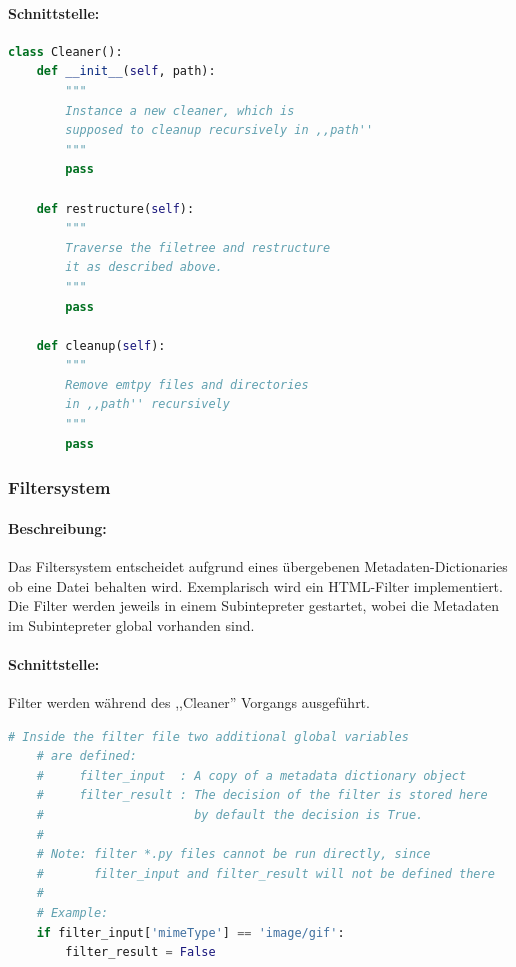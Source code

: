 \paragraph{Schnittstelle:} 
\label{par:schnittstelle_}
\begin{lstlisting}[language=python]
class Cleaner():
    def __init__(self, path):
        """
        Instance a new cleaner, which is
        supposed to cleanup recursively in ,,path''
        """
        pass

    def restructure(self): 
        """
        Traverse the filetree and restructure
        it as described above.
        """
        pass
  
    def cleanup(self):
        """
        Remove emtpy files and directories
        in ,,path'' recursively
        """
        pass
\end{lstlisting}



\subsubsection{Filtersystem}
\label{ssub:filtersystem}
\paragraph{Beschreibung:}
\label{par:beschreibung_}
Das Filtersystem entscheidet aufgrund eines übergebenen Metadaten-Dictionaries ob eine Datei behalten wird. Exemplarisch wird ein HTML-Filter
implementiert. Die Filter werden jeweils in einem Subintepreter gestartet, wobei die Metadaten im Subintepreter global vorhanden sind.

\paragraph{Schnittstelle:}
\label{par:schnittstelle_}
Filter werden während des ,,Cleaner'' Vorgangs ausgeführt.
\begin{lstlisting}[language=python]
    # Inside the filter file two additional global variables
    # are defined:
    #     filter_input  : A copy of a metadata dictionary object
    #     filter_result : The decision of the filter is stored here
    #                     by default the decision is True.
    #
    # Note: filter *.py files cannot be run directly, since 
    #       filter_input and filter_result will not be defined there
    #
    # Example:
    if filter_input['mimeType'] == 'image/gif':
        filter_result = False
\end{lstlisting}


